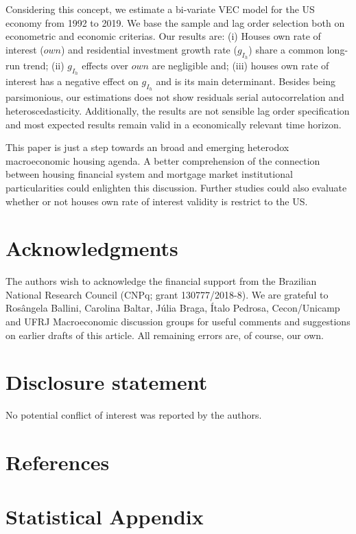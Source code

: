 \documentclass[12pt, a4paper]{article}
\begin{document}
Considering this concept, we estimate a bi-variate VEC model for the US economy from 1992 to 2019.
We base the sample and lag order selection both on econometric and economic criterias.
Our results are:
	(i) Houses own rate of interest (\(own\)) and residential investment growth rate (\(g_{I_h}\)) share a common long-run trend;
	(ii) \(g_{I_h}\) effects over \(own\) are negligible and; 
	(iii) houses own rate of interest has a negative effect on \(g_{I_h}\) and is its main determinant.
Besides being parsimonious, our estimations does not show residuals serial autocorrelation and heteroscedasticity.
Additionally, the results are not sensible lag order specification and most expected results remain valid in a economically relevant time horizon.

This paper is just a step towards an broad and emerging heterodox macroeconomic housing agenda.
A better comprehension of the connection between housing financial system and mortgage market institutional particularities could enlighten this discussion.
Further studies could also evaluate whether or not houses own rate of interest validity is restrict to the US.


\section*{Acknowledgments}
\label{sec:orgce928be}
\noindent The authors wish to acknowledge the financial support from the Brazilian National Research Council (CNPq; grant 130777/2018-8). We are grateful to Rosângela Ballini, Carolina Baltar, Júlia Braga, Ítalo Pedrosa, Cecon/Unicamp and UFRJ Macroeconomic discussion groups for useful comments and suggestions on earlier drafts of this article. All remaining errors are, of course, our own.


\section*{Disclosure statement}
\label{sec:org12c93c0}
No potential conflict of interest was reported by the authors.

\section*{References}
\label{sec:org35eeb71}
\printbibliography[heading=none]


\appendix
\section{Statistical Appendix}
\label{sec:org7190e2a}
\label{appen:A}
\end{document}
